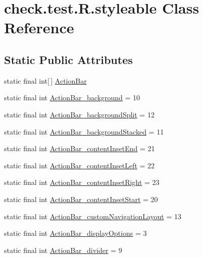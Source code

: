 \hypertarget{classcheck_1_1test_1_1_r_1_1styleable}{}\section{check.\+test.\+R.\+styleable Class Reference}
\label{classcheck_1_1test_1_1_r_1_1styleable}
\subsection*{Static Public Attributes}
\begin{DoxyCompactItemize}
\item 
static final int\mbox{[}$\,$\mbox{]} \hyperlink{classcheck_1_1test_1_1_r_1_1styleable_ad0a4d403cb244ea4d22c6f6ebf2c2cdf}{Action\+Bar}
\item 
static final int \hyperlink{classcheck_1_1test_1_1_r_1_1styleable_a44f8d30ccaef9f5d0d40a81733978053}{Action\+Bar\+\_\+background} = 10
\item 
static final int \hyperlink{classcheck_1_1test_1_1_r_1_1styleable_ab05dbfd1387a947374d7ec306fa7b7a1}{Action\+Bar\+\_\+background\+Split} = 12
\item 
static final int \hyperlink{classcheck_1_1test_1_1_r_1_1styleable_a6cf5689cb912280e627b781eaa714029}{Action\+Bar\+\_\+background\+Stacked} = 11
\item 
static final int \hyperlink{classcheck_1_1test_1_1_r_1_1styleable_a63267bbb6779348e53e468800d19e766}{Action\+Bar\+\_\+content\+Inset\+End} = 21
\item 
static final int \hyperlink{classcheck_1_1test_1_1_r_1_1styleable_af343f343d01cff19f5d4f79c6b1365d8}{Action\+Bar\+\_\+content\+Inset\+Left} = 22
\item 
static final int \hyperlink{classcheck_1_1test_1_1_r_1_1styleable_a2e6574bce599da88fada999852ecddff}{Action\+Bar\+\_\+content\+Inset\+Right} = 23
\item 
static final int \hyperlink{classcheck_1_1test_1_1_r_1_1styleable_a4c5e7ea9ebcd8ec777039551daa8f3f5}{Action\+Bar\+\_\+content\+Inset\+Start} = 20
\item 
static final int \hyperlink{classcheck_1_1test_1_1_r_1_1styleable_ae4307a4bd959bb1787eb44b851f56578}{Action\+Bar\+\_\+custom\+Navigation\+Layout} = 13
\item 
static final int \hyperlink{classcheck_1_1test_1_1_r_1_1styleable_a24df28f3ee73a49d2b813abaabda3b5b}{Action\+Bar\+\_\+display\+Options} = 3
\item 
static final int \hyperlink{classcheck_1_1test_1_1_r_1_1styleable_a0d32a23092ef9676e80af1baef491e9b}{Action\+Bar\+\_\+divider} = 9

\end{DoxyCompactItemize}
